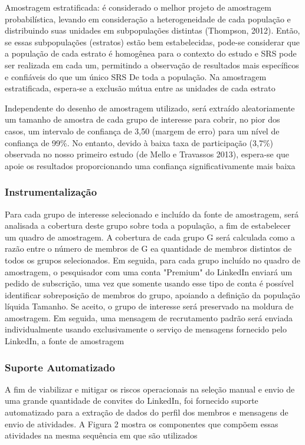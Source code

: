 Amostragem estratificada: é considerado o melhor projeto de amostragem
probabilística, levando em consideração a heterogeneidade de cada população e
distribuindo suas unidades em subpopulações distintas (Thompson, 2012). Então,
se essas subpopulações (estratos) estão bem estabelecidas, pode-se considerar
que a população de cada estrato é homogênea para o contexto do estudo e SRS pode
ser realizada em cada um, permitindo a observação de resultados mais específicos
e confiáveis do que um único SRS De toda a população. Na amostragem
estratificada, espera-se a exclusão mútua entre as unidades de cada estrato

Independente do desenho de amostragem utilizado, será extraído aleatoriamente um
tamanho de amostra de cada grupo de interesse para cobrir, no pior dos casos, um
intervalo de confiança de 3,50 (margem de erro) para um nível de confiança de
99\%. No entanto, devido à baixa taxa de participação (3,7\%) observada no nosso
primeiro estudo (de Mello e Travassos 2013), espera-se que apoie os resultados
proporcionando uma confiança significativamente mais baixa

\subsubsection{Instrumentalização}

Para cada grupo de interesse selecionado e incluído da fonte de amostragem, será
analisada a cobertura deste grupo sobre toda a população, a fim de estabelecer
um quadro de amostragem. A cobertura de cada grupo G será calculada como a razão
entre o número de membros de G ea quantidade de membros distintos de todos os
grupos selecionados. Em seguida, para cada grupo incluído no quadro de
amostragem, o pesquisador com uma conta "Premium" do LinkedIn enviará um pedido
de subscrição, uma vez que somente usando esse tipo de conta é possível
identificar sobreposição de membros do grupo, apoiando a definição da população
líquida Tamanho. Se aceito, o grupo de interesse será preservado na moldura de
amostragem. Em seguida, uma mensagem de recrutamento padrão será enviada
individualmente usando exclusivamente o serviço de mensagens fornecido pelo
LinkedIn, a fonte de amostragem

\subsubsection{Suporte Automatizado}

A fim de viabilizar e mitigar os riscos operacionais na seleção manual e envio
de uma grande quantidade de convites do LinkedIn, foi fornecido suporte
automatizado para a extração de dados do perfil dos membros e mensagens de envio
de atividades. A Figura 2 mostra os componentes que compõem essas atividades na
mesma sequência em que são utilizados

